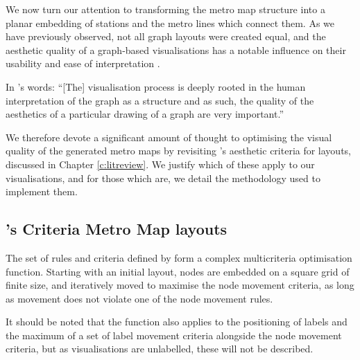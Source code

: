 We now turn our attention to transforming the metro map structure into a planar embedding of stations and the metro lines which connect them. As we have previously observed, not all graph layouts were created equal, and the aesthetic quality of a graph-based visualisations has a notable influence on their usability and ease of interpretation \citep{TheBasisForGraphDrawingAlgorithms, WhichAesthetic, AutomaticMetroMapLayoutThesis, AutomaticMetroMapLayout}. 

In \citeauthor{AutomaticMetroMapLayoutThesis}'s words: ``[The] visualisation process is deeply rooted in the human interpretation of the graph as a structure and as such, the quality of the aesthetics of a particular drawing of a graph are very important.'' \citep[p.24]{AutomaticMetroMapLayoutThesis}

We therefore devote a significant amount of thought to optimising the visual quality of the generated metro maps by revisiting \citeauthor{AutomaticMetroMapLayoutThesis}'s aesthetic criteria for layouts, discussed in Chapter \ref{c:litreview}. We justify which of these apply to our visualisations, and for those which are, we detail the methodology used to implement them.

\subsection{\citeauthor{AutomaticMetroMapLayoutThesis}'s Criteria Metro Map layouts} \label{sec:stottapplication}

The set of rules and criteria defined by \cite{AutomaticMetroMapLayoutThesis} form a complex multicriteria optimisation function. Starting with an initial layout, nodes are embedded on a square grid of finite size, and iteratively moved to maximise the node movement criteria, as long as movement does not violate one of the node movement rules.

It should be noted that the function also applies to the positioning of labels and the maximum of a set of label movement criteria alongside the node movement criteria, but as visualisations are unlabelled, these will not be described.


